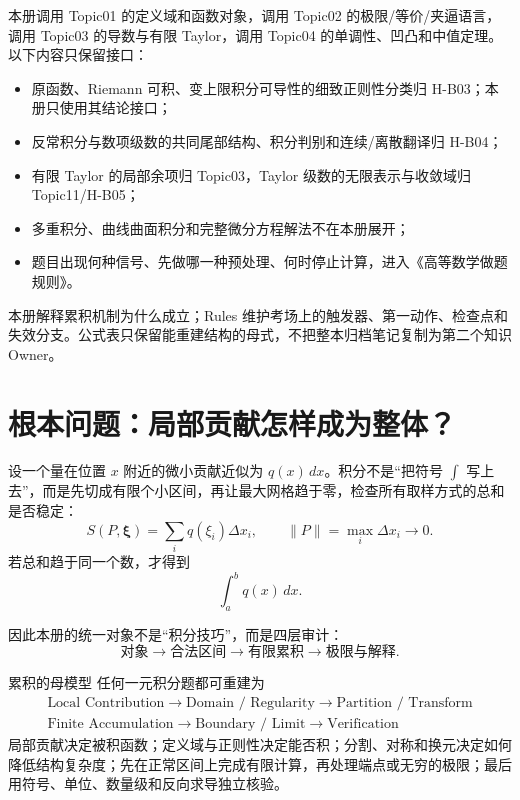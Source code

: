 \documentclass[11pt,a4paper,fontset=fandol]{ctexart}
\begin{document}
本册调用 Topic01 的定义域和函数对象，调用 Topic02 的极限/等价/夹逼语言，调用 Topic03 的导数与有限 Taylor，调用 Topic04 的单调性、凹凸和中值定理。以下内容只保留接口：
\begin{itemize}
  \item 原函数、Riemann 可积、变上限积分可导性的细致正则性分类归 H-B03；本册只使用其结论接口；
  \item 反常积分与数项级数的共同尾部结构、积分判别和连续/离散翻译归 H-B04；
  \item 有限 Taylor 的局部余项归 Topic03，Taylor 级数的无限表示与收敛域归 Topic11/H-B05；
  \item 多重积分、曲线曲面积分和完整微分方程解法不在本册展开；
  \item 题目出现何种信号、先做哪一种预处理、何时停止计算，进入《高等数学做题规则》。
\end{itemize}

本册解释累积机制为什么成立；Rules 维护考场上的触发器、第一动作、检查点和失效分支。公式表只保留能重建结构的母式，不把整本归档笔记复制为第二个知识 Owner。

\section{根本问题：局部贡献怎样成为整体？}

设一个量在位置 $x$ 附近的微小贡献近似为 $q(x)\,dx$。积分不是“把符号 $\int$ 写上去”，而是先切成有限个小区间，再让最大网格趋于零，检查所有取样方式的总和是否稳定：
\[
S(P,\boldsymbol\xi)=\sum_i q(\xi_i)\Delta x_i,
\qquad \lVert P\rVert=\max_i\Delta x_i\to0.
\]
若总和趋于同一个数，才得到
\[
\int_a^b q(x)\,dx.
\]

因此本册的统一对象不是“积分技巧”，而是四层审计：
\[
\boxed{\text{对象} \to \text{合法区间} \to \text{有限累积} \to \text{极限与解释}}.
\]

\begin{corebox}{累积的母模型}
任何一元积分题都可重建为
\[
\boxed{\begin{gathered}
\text{Local Contribution}
\to\text{Domain / Regularity}
\to\text{Partition / Transform}\\
\text{Finite Accumulation}
\to\text{Boundary / Limit}
\to\text{Verification}
\end{gathered}}
\]
局部贡献决定被积函数；定义域与正则性决定能否积；分割、对称和换元决定如何降低结构复杂度；先在正常区间上完成有限计算，再处理端点或无穷的极限；最后用符号、单位、数量级和反向求导独立核验。
\end{corebox}
\end{document}
